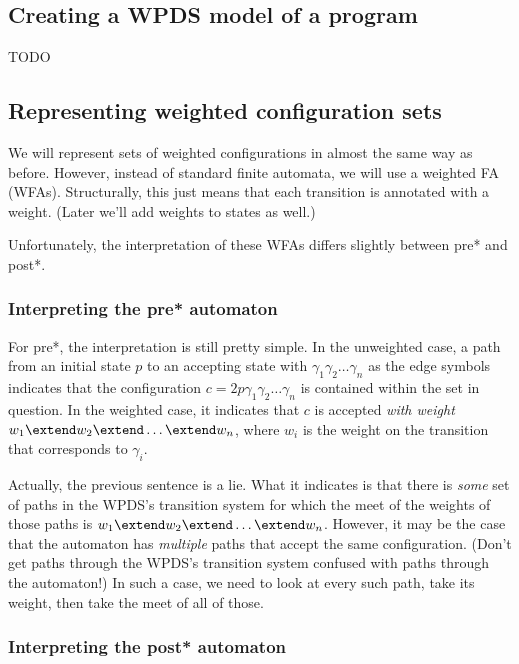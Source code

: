 \documentclass{article}
\newcommand{\config}{2}{\ensuremath{\langle #1, #2 \rangle}}
\begin{document}
\begin{defintion}
\subsection{Creating a WPDS model of a program}

TODO


\subsection{Representing weighted configuration sets}

We will represent sets of weighted configurations in almost the same
way as before. However, instead of standard finite automata, we will
use a weighted FA (WFAs). Structurally, this just means that each
transition is annotated with a weight. (Later we'll add weights to
states as well.)

Unfortunately, the interpretation of these WFAs differs slightly
between pre* and post*.

\subsubsection{Interpreting the pre* automaton}
For pre*, the interpretation is still pretty simple. In the unweighted
case, a path from an initial state $p$ to an accepting state with
$\gamma_1\gamma_2\dots\gamma_n$ as the edge symbols indicates that the
configuration $c = \config{p}{\gamma_1\gamma_2\dots\gamma_n}$ is
contained within the set in question. In the weighted case, it
indicates that $c$ is accepted \emph{with weight} $w_1 \extend w_2
\extend \dots \extend w_n$, where $w_i$ is the weight on the
transition that corresponds to $\gamma_i$.

Actually, the previous sentence is a lie. What it indicates is that
there is \emph{some} set of paths in the WPDS's transition system for
which the meet of the weights of those paths is $w_1 \extend w_2
\extend \dots \extend w_n$. However, it may be the case that the
automaton has \emph{multiple} paths that accept the same
configuration. (Don't get paths through the WPDS's transition system
confused with paths through the automaton!) In such a case, we need to
look at every such path, take its weight, then take the meet of all of
those.

\subsubsection{Interpreting the post* automaton}


\end{defintion}
\end{document}
